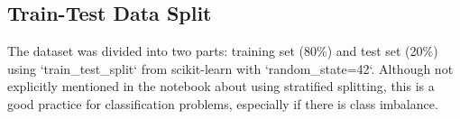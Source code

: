 
\subsection{Train-Test Data Split}

The dataset was divided into two parts: training set (80\%) and test set (20\%) using `train_test_split` from scikit-learn with `random_state=42`. Although not explicitly mentioned in the notebook about using stratified splitting, this is a good practice for classification problems, especially if there is class imbalance.
